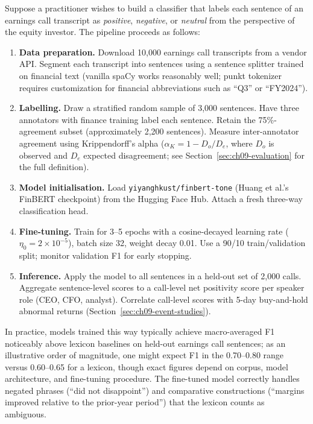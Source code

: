 \begin{example}
\label{ex:finbert-finetuning}
Suppose a practitioner wishes to build a classifier that labels each sentence of an earnings call transcript as \textit{positive}, \textit{negative}, or \textit{neutral} from the perspective of the equity investor. The pipeline proceeds as follows:

\begin{enumerate}
  \item \textbf{Data preparation.} Download 10,000 earnings call transcripts from a vendor API. Segment each transcript into sentences using a sentence splitter trained on financial text (vanilla spaCy works reasonably well; punkt tokenizer requires customization for financial abbreviations such as ``Q3'' or ``FY2024'').

  \item \textbf{Labelling.} Draw a stratified random sample of 3,000 sentences. Have three annotators with finance training label each sentence. Retain the 75\%-agreement subset (approximately 2,200 sentences). Measure inter-annotator agreement using Krippendorff's alpha ($\alpha_K = 1 - D_o/D_e$, where $D_o$ is observed and $D_e$ expected disagreement; see Section~\ref{sec:ch09-evaluation} for the full definition).

  \item \textbf{Model initialisation.} Load \texttt{yiyanghkust/finbert-tone} (Huang et al.'s FinBERT checkpoint) from the Hugging Face Hub. Attach a fresh three-way classification head.

  \item \textbf{Fine-tuning.} Train for 3--5 epochs with a cosine-decayed learning rate ($\eta_0 = 2 \times 10^{-5}$), batch size 32, weight decay 0.01. Use a 90/10 train/validation split; monitor validation F1 for early stopping.

  \item \textbf{Inference.} Apply the model to all sentences in a held-out set of 2,000 calls. Aggregate sentence-level scores to a call-level net positivity score per speaker role (CEO, CFO, analyst). Correlate call-level scores with 5-day buy-and-hold abnormal returns (Section~\ref{sec:ch09-event-studies}).
\end{enumerate}

In practice, models trained this way typically achieve macro-averaged F1 noticeably above lexicon baselines on held-out earnings call sentences; as an illustrative order of magnitude, one might expect F1 in the 0.70--0.80 range versus 0.60--0.65 for a lexicon, though exact figures depend on corpus, model architecture, and fine-tuning procedure. The fine-tuned model correctly handles negated phrases (``did not disappoint'') and comparative constructions (``margins improved relative to the prior-year period'') that the lexicon counts as ambiguous.
\end{example}

